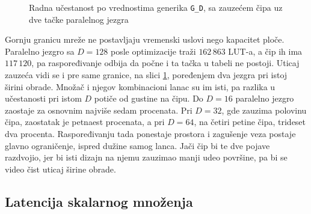 \begin{figure}[H]
\centering
{}
\caption{Radna učestanost po vrednostima generika \texttt{G\_D}, sa zauzećem čipa uz dve tačke paralelnog jezgra}
\label{fig:ecdh_fmax_d}
\end{figure}

Gornju granicu mreže ne postavljaju vremenski uslovi nego kapacitet ploče. Paralelno jezgro sa $D = 128$ posle optimizacije traži $162\,863$ LUT-a, a čip ih ima $117\,120$, pa raspoređivanje odbija da počne i ta tačka u tabeli ne postoji. Uticaj zauzeća vidi se i pre same granice, na slici \ref{fig:ecdh_fmax_d}, poređenjem dva jezgra pri istoj širini obrade. Množač i njegov kombinacioni lanac su im isti, pa razlika u učestanosti pri istom $D$ potiče od gustine na čipu. Do $D = 16$ paralelno jezgro zaostaje za osnovnim najviše sedam procenata. Pri $D = 32$, gde zauzima polovinu čipa, zaostatak je petnaest procenata, a pri $D = 64$, na četiri petine čipa, trideset dva procenta. Raspoređivanju tada ponestaje prostora i zagušenje veza postaje glavno ograničenje, ispred dužine samog lanca. Jači čip bi te dve pojave razdvojio, jer bi isti dizajn na njemu zauzimao manji udeo površine, pa bi se video čist uticaj širine obrade.
\smallbreak
\subsection{Latencija skalarnog množenja}
\label{subsec:rez_ecdh_latencija}

